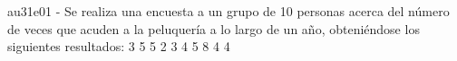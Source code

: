 \documentclass[spanish, 11pt]{exam}
\begin{document}
        \begin{questions}
        \question au31e01 - Se realiza una encuesta a un grupo de 10 personas acerca del número de veces que acuden a la peluquería a lo largo de un año, obteniéndose los siguientes resultados: 3 5 5 2 3 4 5 8 4 4 
        \begin{multicols}{2}
\end{multicols}
\end{questions}
\end{document}
